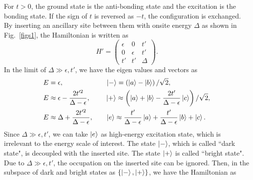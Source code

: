 \documentclass[aps,prl,twocolumn,noshowpacs,superscriptaddress]{revtex4-1}
\begin{document}
For $ t>0 $, the ground state is the anti-bonding state and the excitation is the bonding state. If the sign of $ t $ is reversed as $ -t $, the configuration is exchanged. By inserting an ancillary site between them with onsite energy $ \Delta $ as shown in Fig.~\ref{figs1}, the Hamiltonian is written as
\begin{equation}
	H'=\begin{pmatrix}
		\epsilon & 0 & t' \\0  & \epsilon& t' \\ t' & t' & \Delta
	\end{pmatrix}.
\end{equation}
In the limit of $ \Delta \gg \epsilon, t' $, we have the eigen values and vectors as
\begin{equation}
	\begin{split}
		E&=\epsilon, \ \qquad\qquad\qquad  \ket{-}=\left(\ket{a}-\ket{b}\right)/\sqrt{2}, \\
		E&\approx\epsilon-\frac{2t'^2}{\Delta-\epsilon}, \ \qquad  \ket{+}\approx\left( \ket{a}+\ket{b}-\frac{2t'}{\Delta-\epsilon}\ket{c}\right) /\sqrt{2}  ,\\
		E&\approx \Delta+\frac{2t'^2}{\Delta-\epsilon},  \qquad  \ket{e}\approx\frac{t'}{\Delta-\epsilon}\ket{a}+\frac{t'}{\Delta-\epsilon}\ket{b}+\ket{c}.
	\end{split}
\end{equation}
Since $ \Delta\gg \epsilon,t' $, we can take $ \ket{e} $ as high-energy excitation state, which is irrelevant to the energy scale of interest. The state $ \ket{-} $, which is called ``dark state", is decoupled with the inserted site. The state $ \ket{+} $ is called ``bright state". Due to $ \Delta\gg \epsilon,t' $, the occupation on the inserted site can be ignored. Then, in the subspace of dark and bright states as $ \{\ket{-},\ket{+}\} $, we have the Hamiltonian as
\end{document}
